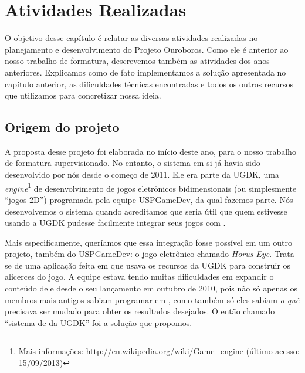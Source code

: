 \chapter{Atividades Realizadas}
\label{cap:atividades}

  O objetivo desse capítulo é relatar as diversas atividades realizadas no 
  planejamento e desenvolvimento do Projeto Ouroboros. Como ele é
  anterior ao nosso trabalho de formatura, descrevemos também as atividades dos
  anos anteriores. Explicamos como de fato implementamos a solução apresentada no
  capítulo anterior, as dificuldades técnicas encontradas e todos os outros
  recursos que utilizamos para concretizar nossa ideia.
  
  \section{Origem do projeto}
  \label{sec:atividades:origem}
  
    A proposta desse projeto foi elaborada no início deste ano, para o nosso
    trabalho de formatura supervisionado. No entanto, o sistema em si já havia
    sido desenvolvido por nós desde o começo de 2011. Ele era parte da UGDK, uma
    \emph{engine}\footnote{Mais informações:
    \url{http://en.wikipedia.org/wiki/Game\_engine} (último acesso: 15/09/2013)}
    de desenvolvimento de jogos eletrônicos bidimensionais (ou
    simplesmente ``jogos 2D'') programada pela equipe USPGameDev, da qual
    fazemos parte. Nós desenvolvemos o sistema quando acreditamos que seria útil
    que quem estivesse usando a UGDK pudesse facilmente integrar seus jogos com .

    Mais especificamente, queríamos que essa integração fosse possível em um
    outro projeto, também do USPGameDev: o jogo eletrônico chamado \emph{Horus
    Eye}\footnotemark. Trata-se de uma aplicação feita em \CXX{} que usava os
    recursos da UGDK para construir os alicerces do jogo. A equipe estava tendo
    muitas dificuldades em expandir o conteúdo dele desde o seu lançamento em
    outubro de 2010, pois não só apenas os membros mais antigos sabiam programar
    em \CXX{}, como também só eles sabiam \emph{o quê} precisava ser mudado para
    obter os resultados desejados. O então chamado ``sistema de  da
    UGDK'' foi a solução que propomos.


